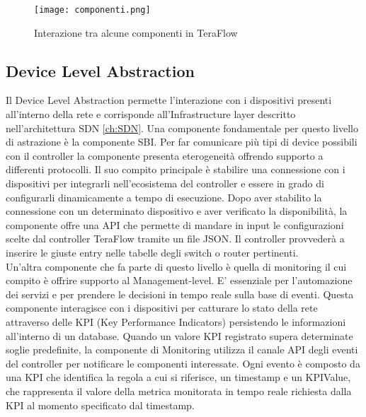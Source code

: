 \begin{figure}[h]
    \centering
   \texttt{[image: componenti.png]}
    \caption{Interazione tra alcune componenti in TeraFlow}
    \label{fig:componenti}
\end{figure}



\subsection{Device Level Abstraction}
Il Device Level Abstraction permette l'interazione con i dispositivi presenti all'interno della rete e corrisponde all'Infrastructure layer descritto nell'architettura SDN \ref{ch:SDN}.
Una componente fondamentale per questo livello di astrazione è la componente SBI.
Per far comunicare più tipi di device possibili con il controller la componente presenta eterogeneità offrendo supporto a differenti protocolli.
Il suo compito principale è stabilire una connessione con i dispositivi per integrarli nell'ecosistema del controller
e essere in grado di configurarli dinamicamente a tempo di esecuzione. 
Dopo aver stabilito la connessione con un determinato dispositivo e aver verificato la disponibilità,
la componente offre una API che permette di mandare in input le configurazioni scelte dal controller TeraFlow tramite un file JSON. 
Il controller provvederà a inserire le giuste entry nelle tabelle degli switch o router pertinenti.
\\Un'altra componente che fa parte di questo livello è quella di monitoring il cui compito è offrire supporto al Management-level.
E' essenziale per l'automazione dei servizi e per prendere le decisioni in tempo reale sulla base di eventi.
Questa componente interagisce con i dispositivi per catturare lo stato della rete attraverso delle KPI (Key Performance Indicators) persistendo le informazioni all'interno di un database. %
Quando un valore KPI registrato supera determinate soglie predefinite, la componente di Monitoring utilizza il canale API degli eventi del controller per notificare le componenti interessate.
Ogni evento è composto da una KPI che identifica la regola a cui si riferisce, un timestamp e un KPIValue, che rappresenta il valore della metrica monitorata in tempo reale richiesta dalla KPI al momento specificato dal timestamp.
